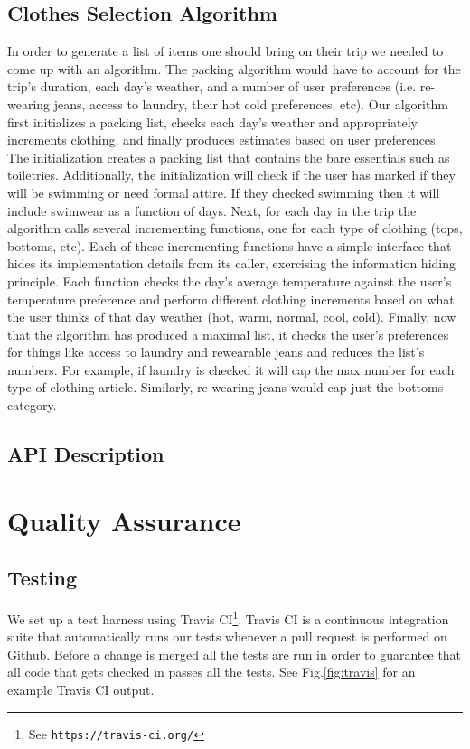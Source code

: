 \documentclass[11pt]{article}
\begin{document}
    \subsection{Clothes Selection Algorithm}
    In order to generate a list of items one should bring on their trip we needed to come up with an algorithm. The packing algorithm would have to account for the trip's duration, each day's weather, and a number of user preferences (i.e. re-wearing jeans, access to laundry, their hot cold preferences, etc). Our algorithm first initializes a packing list, checks each day's weather and appropriately increments clothing, and finally produces estimates based on user preferences. The initialization creates a packing list that contains the bare essentials such as toiletries. Additionally, the initialization will check if the user has marked if they will be swimming or need formal attire. If they checked swimming then it will include swimwear as a function of days. Next, for each day in the trip the algorithm calls several incrementing functions, one for each type of clothing (tops, bottoms, etc). Each of these incrementing functions have a simple interface that hides its implementation details from its caller, exercising the information hiding principle. Each function checks the day's average temperature against the user's temperature preference and perform different clothing increments based on what the user thinks of that day weather (hot, warm, normal, cool, cold). Finally, now that the algorithm has produced a maximal list, it checks the user's preferences for things like access to laundry and rewearable jeans and reduces the list's numbers. For example, if laundry is checked it will cap the max number for each type of clothing article. Similarly, re-wearing jeans would cap just the bottoms category. 

    \subsection{API Description}



\section{Quality Assurance}

\subsection{Testing}
We set up a test harness using Travis CI\footnote{See \texttt{https://travis-ci.org/}}. Travis CI is a continuous integration suite that automatically runs our tests whenever a pull request is performed on Github. Before a change is merged all the tests are run in order to guarantee that all code that gets checked in passes all the tests. See Fig.\ref{fig:travis} for an example Travis CI output.
\end{document}
